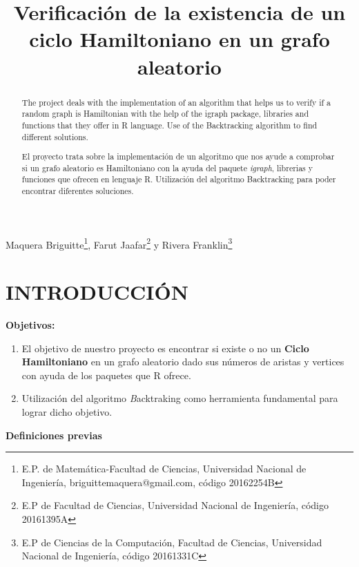 \documentclass[journal]{IEEEtran}
\title{\LARGE \bf
		Verificación de la existencia de un ciclo Hamiltoniano en un grafo aleatorio}
\begin{document}
\maketitle
{Maquera Briguitte\footnote{E.P. de Matemática-Facultad de Ciencias, 	Universidad Nacional de Ingeniería, briguittemaquera@gmail.com, código 20162254B}, Farut Jaafar\footnote{E.P de Facultad de Ciencias, 	Universidad Nacional de Ingeniería, código 	20161395A} y Rivera Franklin\footnote{E.P de Ciencias de la Computación, Facultad de Ciencias, Universidad Nacional de Ingeniería, código 20161331C}}
\vspace{10mm}
\thispagestyle{empty}

\pagestyle{empty}


\begin{abstract}
	
	The project deals with the implementation of an algorithm that helps us to verify if a random graph is Hamiltonian with the help of the igraph package, libraries and functions that they offer in R language. Use of the Backtracking algorithm to find different solutions.
\end{abstract}

\begin{abstract}
	
	El proyecto trata sobre la implementación de un algoritmo que nos ayude a comprobar si un grafo aleatorio es Hamiltoniano  con la ayuda del paquete \textit{igraph}, librerias y funciones que ofrecen en lenguaje R. Utilización del algoritmo Backtracking para poder encontrar diferentes soluciones.

\end{abstract}

	
\section{\large\bf INTRODUCCI{\'O}N}
 
 {\bf Objetivos:}\\
 \begin{enumerate}
 	\item El objetivo de nuestro proyecto es encontrar si existe o no un {\bf Ciclo Hamiltoniano} en un grafo aleatorio dado sus números de aristas y vertices con ayuda de los paquetes que R ofrece.
 	\item Utilización del algoritmo {\textit Backtraking} como herramienta fundamental para lograr dicho objetivo.
 \end{enumerate}
\vspace{0.2mm}
{\bf Definiciones previas}\\
\vspace{0.2mm}
\end{document}
